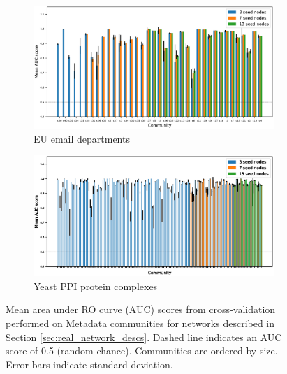 \documentclass[a4paper,10pt]{article}
\begin{document}
\begin{figure}[ht]
     \centering
    \begin{subfigure}[b]{\textwidth}
        \centering
        \includegraphics[width=\textwidth]{images/eu_roc_scores.eps}
        \caption{EU email departments}
    \end{subfigure}
    
    \centering
    \begin{subfigure}[b]{\textwidth}
        \centering
        \includegraphics[width=\textwidth]{images/yeast_ppi_roc_scores.eps}
        \caption{Yeast PPI protein complexes}
    \end{subfigure}
    
    \caption{Mean area under RO curve (AUC) scores from cross-validation performed on Metadata communities for networks described in Section \ref{sec:real_network_descs}.
    Dashed line indicates an AUC score of 0.5 (random chance).
    Communities are ordered by size.
    Error bars indicate standard deviation.
    }
    \label{fig:real_network_results}
\end{figure}
\end{document}
